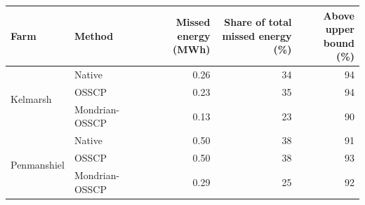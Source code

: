 \begin{tabular}{@{}llrrr@{}}
\toprule
Farm & Method
& \shortstack{Missed energy\\(MWh)}
& \shortstack{Share of total\\missed energy (\%)}
& \shortstack{Above upper\\bound (\%)} \\
\midrule
\multirow[t]{3}{*}{Kelmarsh}
 & Native         & 0.26 & 34 & 94 \\
 & OSSCP          & 0.23 & 35 & 94 \\
 & Mondrian-OSSCP & 0.13 & 23 & 90 \\
\midrule
\multirow[t]{3}{*}{Penmanshiel}
 & Native         & 0.50 & 38 & 91 \\
 & OSSCP          & 0.50 & 38 & 93 \\
 & Mondrian-OSSCP & 0.29 & 25 & 92 \\
\bottomrule
\end{tabular}